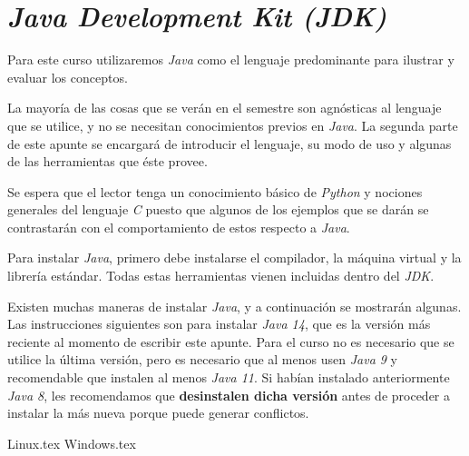 \chapter{\textit{Java Development Kit (JDK)}}
  Para este curso utilizaremos \textit{Java} como el lenguaje predominante para ilustrar y
  evaluar los conceptos.

  La mayoría de las cosas que se verán en el semestre son agnósticas al lenguaje que se 
  utilice, y no se necesitan conocimientos previos en \textit{Java}.
  La segunda parte de este apunte se encargará de introducir el lenguaje, su modo de uso y
  algunas de las herramientas que éste provee.

  Se espera que el lector tenga un conocimiento básico de \textit{Python} y nociones 
  generales del lenguaje \textit{C} puesto que algunos de los ejemplos que se darán se 
  contrastarán con el comportamiento de estos respecto a \textit{Java}.

  Para instalar \textit{Java}, primero debe instalarse el compilador, la máquina virtual
  y la librería estándar.
  Todas estas herramientas vienen incluidas dentro del \textit{JDK}.

  Existen muchas maneras de instalar \textit{Java}, y a continuación se mostrarán 
  algunas.
  Las instrucciones siguientes son para instalar \textit{Java 14}, que es la versión más
  reciente al momento de escribir este apunte.
  Para el curso no es necesario que se utilice la última versión, pero es necesario que
  al menos usen \textit{Java 9} y recomendable que instalen al menos \textit{Java 11}.
  Si habían instalado anteriormente \textit{Java 8}, les recomendamos que 
  \textbf{desinstalen dicha versión} antes de proceder a instalar la más nueva porque 
  puede generar conflictos.

  {Linux.tex}
  {Windows.tex}
%